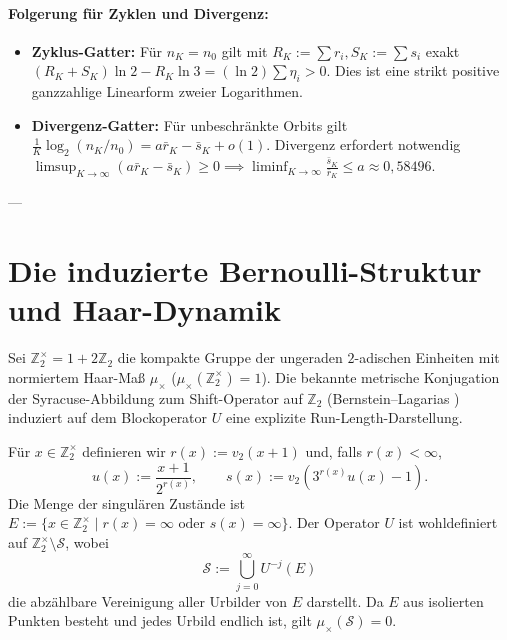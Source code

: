 \documentclass[11pt,reqno]{amsart}
\theoremstyle{definition}
\theoremstyle{remark}
\numberwithin{equation}{section}
\begin{document}
\paragraph{Folgerung f\"ur Zyklen und Divergenz:}
\begin{itemize}
\item \textbf{Zyklus-Gatter:} F\"ur $n_K = n_0$ gilt mit $R_K := \sum r_i, S_K := \sum s_i$ exakt $(R_K + S_K) \ln 2 - R_K \ln 3 = (\ln 2) \sum \eta_i > 0$. Dies ist eine strikt positive ganzzahlige Linearform zweier Logarithmen.
\item \textbf{Divergenz-Gatter:} F\"ur unbeschr\"ankte Orbits gilt $\frac{1}{K} \log_2(n_K/n_0) = a \bar{r}_K - \bar{s}_K + o(1)$. Divergenz erfordert notwendig $\limsup_{K \to \infty} (a \bar{r}_K - \bar{s}_K) \ge 0 \implies \liminf_{K \to \infty} \frac{\bar{s}_K}{\bar{r}_K} \le a \approx 0{,}58496$.
\end{itemize}

---

\section{Die induzierte Bernoulli-Struktur und Haar-Dynamik}

Sei $\mathbb{Z}_2^\times = 1 + 2\mathbb{Z}_2$ die kompakte Gruppe der ungeraden $2$-adischen Einheiten mit normiertem Haar-Ma\ss{} $\mu_\times$ ($\mu_\times(\mathbb{Z}_2^\times) = 1$). 
Die bekannte metrische Konjugation der Syracuse-Abbildung zum Shift-Operator auf $\mathbb{Z}_2$ (Bernstein--Lagarias \cite{BernsteinLagarias1996}) induziert auf dem Blockoperator $U$ eine explizite Run-Length-Darstellung.

F\"ur $x \in \mathbb{Z}_2^\times$ definieren wir $r(x) := v_2(x+1)$ und, falls $r(x) < \infty$,
\begin{equation}
u(x) := \frac{x+1}{2^{r(x)}}, \qquad s(x) := v_2(3^{r(x)}u(x) - 1).
\end{equation}
Die Menge der singul\"aren Zust\"ande ist $E := \{x \in \mathbb{Z}_2^\times \mid r(x) = \infty \text{ oder } s(x) = \infty\}$. 
Der Operator $U$ ist wohldefiniert auf $\mathbb{Z}_2^\times \setminus \mathcal{S}$, wobei
\begin{equation}
\mathcal{S} := \bigcup_{j=0}^\infty U^{-j}(E)
\end{equation}
die abz\"ahlbare Vereinigung aller Urbilder von $E$ darstellt. Da $E$ aus isolierten Punkten besteht und jedes Urbild endlich ist, gilt $\mu_\times(\mathcal{S}) = 0$.
\end{document}
